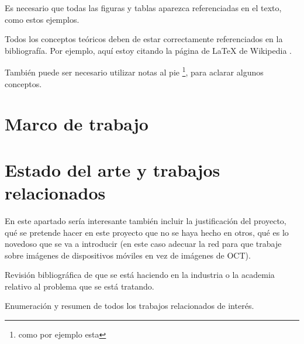 Es necesario que todas las figuras y tablas aparezca referenciadas en el texto, como estos ejemplos.

Todos los conceptos teóricos deben de estar correctamente referenciados en la bibliografía. Por ejemplo, aquí estoy citando la página de \LaTeX{} de Wikipedia \cite{wiki:latex}.

También puede ser necesario utilizar notas al pie \footnote{como por ejemplo esta}, para aclarar algunos conceptos.

\section{Marco de trabajo}

\section{Estado del arte y trabajos relacionados}

En este apartado sería interesante también incluir la justificación del proyecto, qué se pretende hacer en este proyecto que no se haya hecho en otros, qué es lo novedoso que se va a introducir (en este caso adecuar la red para que trabaje sobre imágenes de dispositivos móviles en vez de imágenes de OCT).

Revisión bibliográfica de que se está haciendo en la industria o la academia relativo al problema que se está tratando.

Enumeración y resumen de todos los trabajos relacionados de interés.

